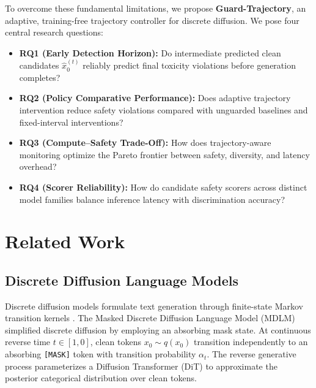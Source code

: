 \documentclass[conference]{IEEEtran}
\begin{document}
To overcome these fundamental limitations, we propose \textbf{Guard-Trajectory}, an adaptive, training-free trajectory controller for discrete diffusion. We pose four central research questions:
\begin{itemize}
    \item \textbf{RQ1 (Early Detection Horizon):} Do intermediate predicted clean candidates $\hat{x}_0^{(t)}$ reliably predict final toxicity violations before generation completes?
    \item \textbf{RQ2 (Policy Comparative Performance):} Does adaptive trajectory intervention reduce safety violations compared with unguarded baselines and fixed-interval interventions?
    \item \textbf{RQ3 (Compute--Safety Trade-Off):} How does trajectory-aware monitoring optimize the Pareto frontier between safety, diversity, and latency overhead?
    \item \textbf{RQ4 (Scorer Reliability):} How do candidate safety scorers across distinct model families balance inference latency with discrimination accuracy?
\end{itemize}

\section{Related Work}

\subsection{Discrete Diffusion Language Models}
Discrete diffusion models formulate text generation through finite-state Markov transition kernels \cite{sohl2015deep,austin2021structured}. The Masked Discrete Diffusion Language Model (MDLM) \cite{sahoo2024simple} simplified discrete diffusion by employing an absorbing mask state. At continuous reverse time $t \in [1, 0]$, clean tokens $x_0 \sim q(x_0)$ transition independently to an absorbing \texttt{[MASK]} token with transition probability $\alpha_t$. The reverse generative process parameterizes a Diffusion Transformer (DiT) to approximate the posterior categorical distribution over clean tokens.
\end{document}
